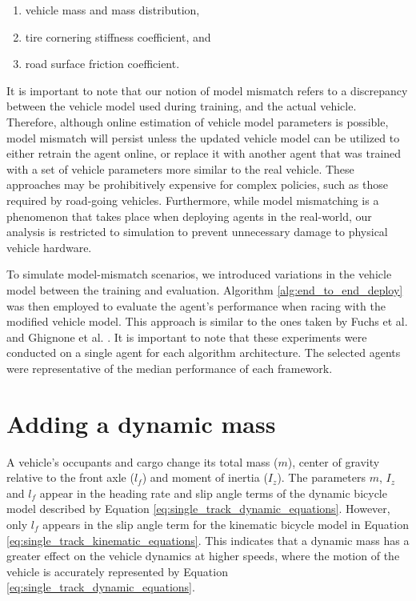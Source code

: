 \begin{enumerate}
\item vehicle mass and mass distribution,
\item tire cornering stiffness coefficient, and
\item road surface friction coefficient.
\end{enumerate}


It is important to note that our notion of model mismatch refers to a discrepancy between the vehicle model used during training, and the actual vehicle.
Therefore, although online estimation of vehicle model parameters is possible, model mismatch will persist unless the updated vehicle model can be utilized to either retrain the agent online, or replace it with another agent that was trained with a set of vehicle parameters more similar to the real vehicle.
These approaches may be prohibitively expensive for complex policies, such as those required by road-going vehicles.
Furthermore, while model mismatching is a phenomenon that takes place when deploying agents in the real-world, our analysis is restricted to simulation to prevent unnecessary damage to physical vehicle hardware.

To simulate model-mismatch scenarios, we introduced variations in the vehicle model between the training and evaluation.
Algorithm \ref{alg:end_to_end_deploy} was then employed to evaluate the agent's performance when racing with the modified vehicle model.
This approach is similar to the ones taken by Fuchs et al. \cite{Fuchs2021} and Ghignone et al. \cite{Ghignone2022}.
It is important to note that these experiments were conducted on a single agent for each algorithm architecture.
The selected agents were representative of the median performance of each framework.





\section{Adding a dynamic mass}

A vehicle's occupants and cargo change its total mass ($m$), center of gravity relative to the front axle ($l_f$) and moment of inertia ($I_z$).
The parameters $m$, $I_z$ and $l_f$ appear in the heading rate and slip angle terms of the dynamic bicycle model described by Equation \ref{eq:single_track_dynamic_equations}.
However, only $l_f$ appears in the slip angle term for the kinematic bicycle model in Equation \ref{eq:single_track_kinematic_equations}.
This indicates that a dynamic mass has a greater effect on the vehicle dynamics at higher speeds, where the motion of the vehicle is accurately represented by Equation \ref{eq:single_track_dynamic_equations}.


